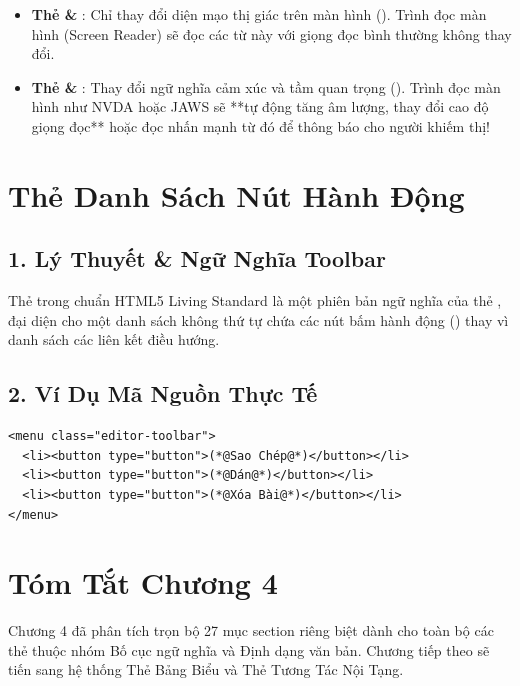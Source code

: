 \begin{tipBox}
\begin{itemize}[leftmargin=1.5em, itemsep=4pt]
    \item \textbf{Thẻ  \& }: Chỉ thay đổi diện mạo thị giác trên màn hình (). Trình đọc màn hình (Screen Reader) sẽ đọc các từ này với giọng đọc bình thường không thay đổi.
    \item \textbf{Thẻ  \& }: Thay đổi ngữ nghĩa cảm xúc và tầm quan trọng (). Trình đọc màn hình như NVDA hoặc JAWS sẽ **tự động tăng âm lượng, thay đổi cao độ giọng đọc** hoặc đọc nhấn mạnh từ đó để thông báo cho người khiếm thị!
\end{itemize}
\end{tipBox}

\section{Thẻ Danh Sách Nút Hành Động }
\subsection{1. Lý Thuyết \& Ngữ Nghĩa Toolbar}
Thẻ  trong chuẩn HTML5 Living Standard là một phiên bản ngữ nghĩa của thẻ , đại diện cho một danh sách không thứ tự chứa các nút bấm hành động () thay vì danh sách các liên kết điều hướng.

\subsection{2. Ví Dụ Mã Nguồn Thực Tế}
\begin{codeWindow}
\begin{lstlisting}[language=HTML5]
<menu class="editor-toolbar">
  <li><button type="button">(*@Sao Chép@*)</button></li>
  <li><button type="button">(*@Dán@*)</button></li>
  <li><button type="button">(*@Xóa Bài@*)</button></li>
</menu>
\end{lstlisting}
\end{codeWindow}

\begin{browserWindow}
\sffamily\small
{} \;\;
 \;\;
\end{browserWindow}

\section{Tóm Tắt Chương 4}
Chương 4 đã phân tích trọn bộ 27 mục section riêng biệt dành cho toàn bộ các thẻ thuộc nhóm Bố cục ngữ nghĩa và Định dạng văn bản. Chương tiếp theo sẽ tiến sang hệ thống Thẻ Bảng Biểu và Thẻ Tương Tác Nội Tạng.

